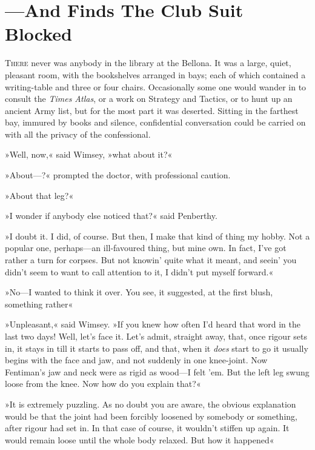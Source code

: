 \chapter{—And Finds The Club Suit Blocked}
\lettrine[lines=4]{T}{here} never was anybody in the library at the Bellona. It was a large, quiet, pleasant room, with the bookshelves arranged in bays; each of which contained a writing-table and three or four chairs. Occasionally some one would wander in to consult the \textit{Times Atlas}, or a work on Strategy and Tactics, or to hunt up an ancient Army list, but for the most part it was deserted. Sitting in the farthest bay, immured by books and silence, confidential conversation could be carried on with all the privacy of the confessional.

»Well, now,« said Wimsey, »what about it?«

»About---?« prompted the doctor, with professional caution.

»About that leg?«

»I wonder if anybody else noticed that?« said Penberthy.

»I doubt it. I did, of course. But then, I make that kind of thing my hobby. Not a popular one, perhaps\allowbreak---\allowbreak an ill-favoured thing, but mine own. In fact, I've got rather a turn for corpses. But not knowin' quite what it meant, and seein' you didn't seem to want to call attention to it, I didn't put myself forward.«

»No\allowbreak---\allowbreak I wanted to think it over. You see, it suggested, at the first blush, something rather\longdash«

»Unpleasant,« said Wimsey. »If you knew how often I'd heard that word in the last two days! Well, let's face it. Let's admit, straight away, that, once rigour sets in, it stays in till it starts to pass off, and that, when it \textit{does} start to go it usually begins with the face and jaw, and not suddenly in one knee-joint. Now Fentiman's jaw and neck were as rigid as wood\allowbreak---\allowbreak I felt 'em. But the left leg swung loose from the knee. Now how do you explain that?«

»It is extremely puzzling. As no doubt you are aware, the obvious explanation would be that the joint had been forcibly loosened by somebody or something, after rigour had set in. In that case of course, it wouldn't stiffen up again. It would remain loose until the whole body relaxed. But how it happened\longdash«

